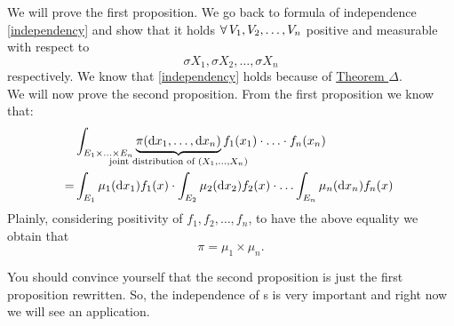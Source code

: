 \documentclass{report}
\begin{document}
\begin{fancyproof}
	We will prove the first proposition. We go back to formula of independence \ref{independency} and show that it holds $\forall\, V_1,V_2,\ldots,V_n$ positive and measurable with respect to
	\[\sigma X_1,\sigma X_2,\ldots,\sigma X_n\]
	respectively. We know that \ref{independency} holds because of \bigskip\hyperref[teodelta]{Theorem $\Delta$}.\\ 
	We will now prove the second proposition. From the first proposition we know that:
	\begin{align*}
		&\int_{E_1\times\ldots\times E_n}\underbrace{\pi(\dx_1,\ldots,\dx_n)}_{\mathclap{\tiny\text{joint distribution of }(X_1,\ldots,X_n)}}f_1(x_1)\cdot\ldots\cdot f_n(x_n)\\
		=&\int_{E_1}\mu_1(\dx_1)f_1(x)\cdot\int_{E_2}\mu_2(\dx_2)f_2(x)\cdot\ldots\int_{E_n}\mu_n(\dx_n)f_n(x)\
	\end{align*}
	Plainly, considering positivity of $f_1,f_2,\ldots,f_n$, to have the above equality we obtain that
	\[\pi=\mu_1\times\mu_n.\]
\end{fancyproof}
You should convince yourself that the second proposition is just the first proposition rewritten. So, the independence of \rv s is very important and right now we will see an application.
\end{document}
